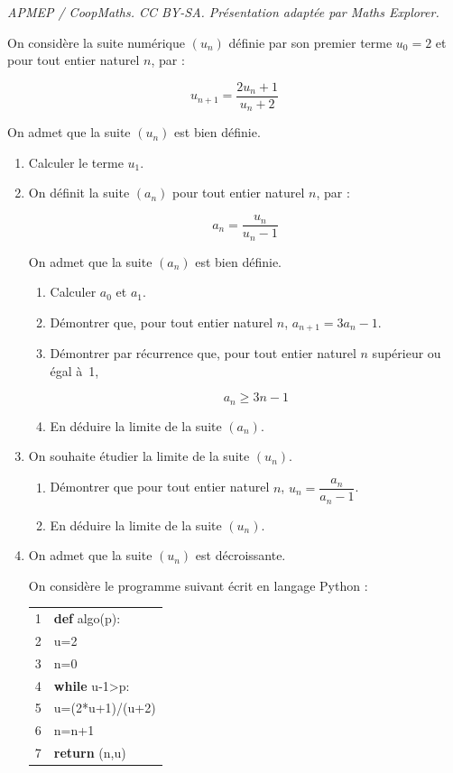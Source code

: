 \documentclass[10pt]{article}
\begin{document}
\noindent\textit{APMEP / CoopMaths. CC BY-SA. Présentation adaptée par Maths Explorer.}\par\medskip
\medskip

On considère la suite numérique $\left(u_{n}\right)$ définie par son premier terme $u_{0}=2$ et pour tout entier naturel $n$, par :


\[u_{n+1}=\dfrac{2 u_{n}+1}{u_{n}+2}\]

On admet que la suite $\left(u_{n}\right)$ est bien définie.

\begin{enumerate}
\item Calculer le terme $u_{1}$.
\item On définit la suite $\left(a_{n}\right)$ pour tout entier naturel $n$, par :

\[a_{n}=\dfrac{u_{n}}{u_{n}-1}\]

On admet que la suite $\left(a_{n}\right)$ est bien définie.

	\begin{enumerate}
		\item Calculer $a_{0}$ et $a_{1}$.

		\item Démontrer que, pour tout entier naturel $n$, $a_{n+1}=3 a_{n}-1$.

		\item Démontrer par récurrence que, pour tout entier naturel $n$ supérieur ou égal à~1,

\[a_{n} \geqslant 3 n-1\]

		\item En déduire la limite de la suite $\left(a_{n}\right)$.
	\end{enumerate}
\item On souhaite étudier la limite de la suite $\left(u_{n}\right)$.
	\begin{enumerate}
		\item Démontrer que pour tout entier naturel $n$, $u_{n}=\dfrac{a_{n}}{a_{n}-1}$.

		\item En déduire la limite de la suite $\left(u_{n}\right)$.
		\end{enumerate}
\item On admet que la suite $\left(u_{n}\right)$ est décroissante.

On considère le programme suivant écrit en langage Python :

\begin{center}
\begin{ttfamily}
\begin{tabularx}{8cm}{|l @{\quad} X|}\hline
	1& \textbf{def} algo(p):\\
	2& \quad u=2\\
	3& \quad n=0\\
	4& \quad \textbf{while} u-1>p:\\
	5& \quad\quad u=(2*u+1)/(u+2)\\
	6& \quad\quad n=n+1\\
	7& \quad \textbf{return} (n,u)\\ \hline
\end{tabularx}
\end{ttfamily}
\end{center}


\end{enumerate}
\end{document}
